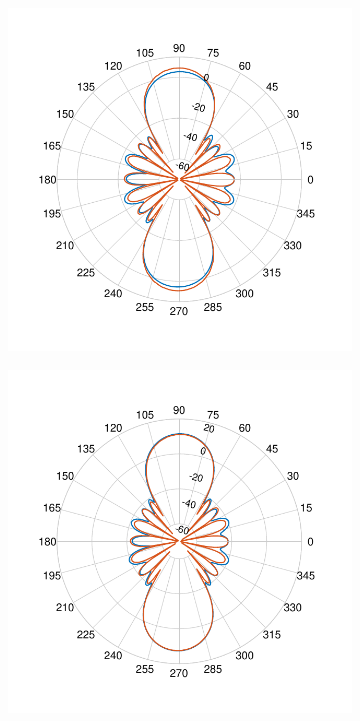 \documentclass[12pt,a4paper,twocolumn]{article}
\begin{document}
{\begin{figure}
	\begin{center}
		\begin{subfigure}{0.25\linewidth}
			\includegraphics[scale=0.5]{pcb_pifa_array_azimuth_90_comparison.pdf}
			\caption{}
		\end{subfigure}
		\begin{subfigure}{0.25\linewidth}
		\includegraphics[scale=0.5]{pcb_pifa_array_elevation_90_comparison.pdf}
		\caption{}
	\end{subfigure}


\end{center}
\end{figure}}
\end{document}
